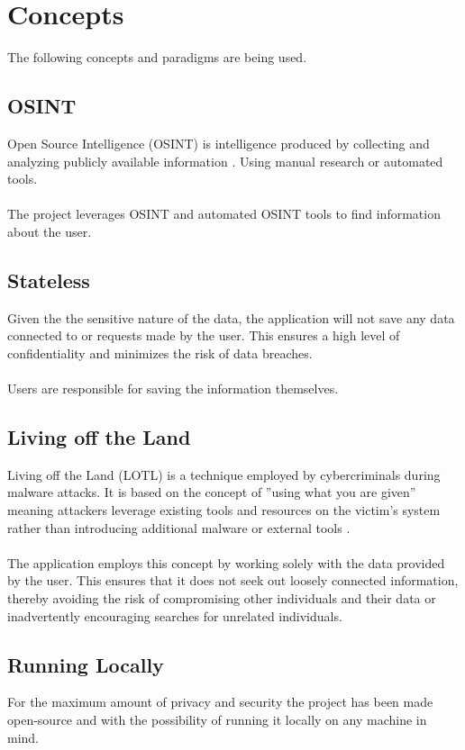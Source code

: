 \documentclass[
    a4paper,
    pagesize,
	pdftex,
    12pt,
]{scrartcl}
\begin{document}
\section{Concepts}
The following concepts and paradigms are being used.

\subsection{OSINT}
Open Source Intelligence (OSINT) is intelligence produced by collecting and analyzing  publicly available information \cite{what-is-osint}. Using manual research or automated tools.
\\ \\
The project leverages OSINT and automated OSINT tools to find information about the user.

\subsection{Stateless}
Given the the sensitive nature of the data, the application will not save any data connected to or requests made by the user. This ensures a high level of confidentiality and minimizes the risk of data breaches. 
\\ \\
Users are responsible for saving the information themselves. 

\subsection{Living off the Land}
Living off the Land (LOTL) is a technique employed by cybercriminals during malware attacks. It is based on the concept of ''using what you are given'' meaning attackers leverage existing tools and resources on the victim's system rather than introducing additional malware or external tools \cite{what-is-lotl}.
\\ \\
The application employs this concept by working solely with the data provided by the user. This ensures that it does not seek out loosely connected information, thereby avoiding the risk of compromising other individuals and their data or inadvertently encouraging searches for unrelated individuals.

\subsection{Running Locally}
For the maximum amount of privacy and security the project has been made open-source and with the possibility of running it locally on any machine in mind. 
\end{document}
